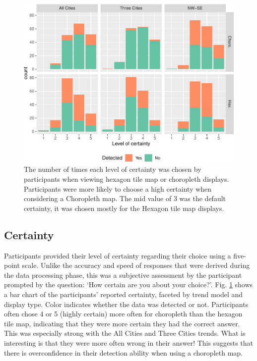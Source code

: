 \documentclass[journal]{vgtc}                     %
\begin{document}
\begin{figure}
\includegraphics[width=1\linewidth]{paper_files/figure-latex/certainty-1} \caption{The number of times each level of certainty was chosen by participants when viewing hexagon tile map or choropleth displays. Participants were more likely to choose a high certainty when considering a Choropleth map. The mid value of 3 was the default certainty, it was chosen mostly for the Hexagon tile map displays.}\label{fig:certainty}
\end{figure}

\hypertarget{certainty}{%
\subsection{Certainty}\label{certainty}}

Participants provided their level of certainty regarding their choice using a five-point scale.
Unlike the accuracy and speed of responses that were derived during the data processing phase, this was a subjective
assessment by the participant prompted by the question: `How certain are you about your choice?'.
Fig. \ref{fig:certainty} shows a bar chart of the participants' reported certainty, faceted by trend model and display type. Color indicates whether the data was detected or not. Participants often chose 4 or 5 (highly certain) more often for choropleth than the hexagon tile map, indicating that they were more certain they had the correct answer.  This was especially strong with the All Cities and Three Cities trends. What is interesting is that they were more often wrong in their answer! This suggests that there is overconfidence in their detection ability when using a choropleth map. %
\end{document}
